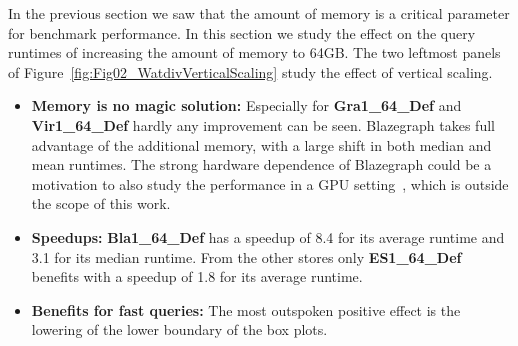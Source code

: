 %

%
%
In the previous section we saw that the amount of memory is a critical parameter for benchmark performance. 
In this section we study the effect on the query runtimes of increasing the amount of memory to 64GB.
The two leftmost panels of Figure~\ref{fig:Fig02_WatdivVerticalScaling} study the effect of vertical scaling. 
%

\begin{itemize}
	\item \textbf{Memory is no magic solution:} Especially for \textbf{Gra1\_64\_Def} and \textbf{Vir1\_64\_Def} hardly any improvement can be seen. Blazegraph takes full advantage of the additional memory, with a large shift in both median and mean runtimes. The strong hardware dependence of Blazegraph could be a motivation to also study the performance in a GPU setting~\cite{blazegraphgpu}, which is outside the scope of this work.
	\item \textbf{Speedups:} \textbf{Bla1\_64\_Def} has a speedup of 8.4 for its average runtime and 3.1 for its median runtime. From the other stores only \textbf{ES1\_64\_Def} benefits with a speedup of 1.8 for its average runtime.
	\item \textbf{Benefits for fast queries:} The most outspoken positive effect is the lowering of the lower boundary of the box plots.  
\end{itemize}




